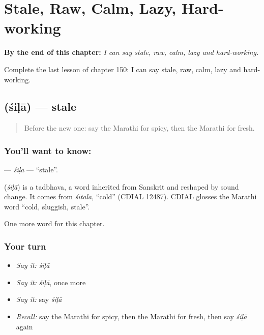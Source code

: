 
\chapter{Stale, Raw, Calm, Lazy, Hard-working}
\label{ch:mr-stale-raw-calm-lazy-hard-working}

\begin{chapteropening}
\textbf{By the end of this chapter:} \emph{I can say stale, raw, calm, lazy and hard-working.}

Complete the last lesson of chapter 150: I can say stale, raw, calm, lazy and hard-working.
\end{chapteropening}

\section[\texorpdfstring{\mr{शिळा} (śiḷā)}{शिळा (śiḷā)}]{ (śiḷā) — stale}

\label{lesson:MR-C150-sila}



\begin{quote}
Before the new one: say the Marathi for spicy, then the Marathi for fresh.
\end{quote}

\subsection*{You'll want to know: }
\textbf{} — \emph{śiḷā} — \textquotedblleft{}stale\textquotedblright{}.

\begin{cousinweb}
\textbf{} (\emph{śiḷā}) is a tadbhava, a word inherited from Sanskrit and reshaped by sound change. It comes from \emph{śītala}, \textquotedblleft{}cold\textquotedblright{} (CDIAL 12487). CDIAL glosses the Marathi word \textquotedblleft{}cold, sluggish, stale\textquotedblright{}.
\end{cousinweb}

\begin{grammarlens}[title={What you've built}]
One more word for this chapter.
\end{grammarlens}

\subsection*{Your turn}
\begin{itemize}
\raggedright
  \item \emph{Say it:} \emph{śiḷā}
  \item \emph{Say it:} \emph{śiḷā}, once more
  \item \emph{Say it:} say \emph{śiḷā}
  \item \emph{Recall:} say the Marathi for spicy, then the Marathi for fresh, then say \emph{śiḷā} again
\end{itemize}

